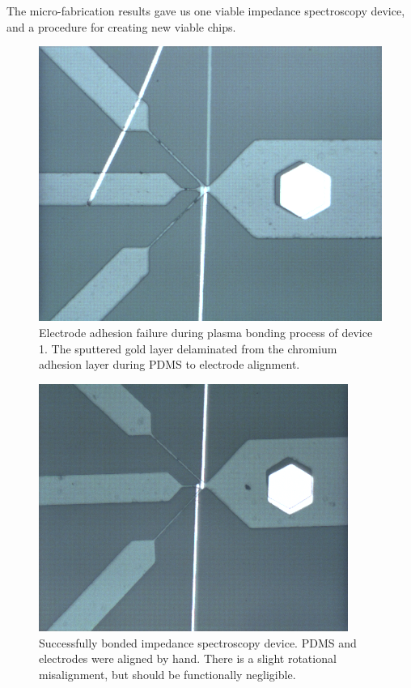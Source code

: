 \par The micro-fabrication results gave us one viable impedance spectroscopy device, and a procedure for creating new viable chips.


\begin{figure}[h]
    \centering
    \includegraphics[width=\textwidth]{images/bad_device.png}
    \caption{Electrode adhesion failure during plasma bonding process of device 1. The sputtered gold layer delaminated from the chromium adhesion layer during PDMS to electrode alignment.}
    \label{fig:bad_device}
\end{figure}

\begin{figure}[h]
    \centering
    \includegraphics[width=0.9\textwidth]{images/good_device.png}
    \caption{Successfully bonded impedance spectroscopy device. PDMS and electrodes were aligned by hand. There is a slight rotational misalignment, but should be functionally negligible.}
    \label{fig:good_device}
\end{figure}

